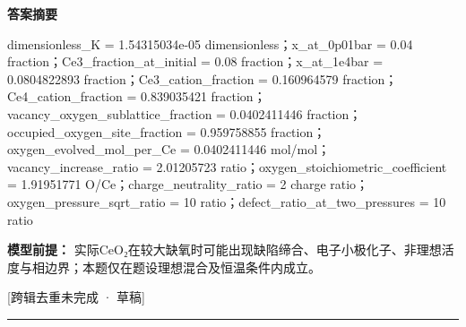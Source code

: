 \documentclass[UTF8,11pt,a4paper]{ctexart}
\begin{document}
\noindent\textbf{答案摘要}\par
dimensionless\_K = 1.54315034e-05 dimensionless；x\_at\_0p01bar = 0.04 fraction；Ce3\_fraction\_at\_initial = 0.08 fraction；x\_at\_1e4bar = 0.0804822893 fraction；Ce3\_cation\_fraction = 0.160964579 fraction；Ce4\_cation\_fraction = 0.839035421 fraction；vacancy\_oxygen\_sublattice\_fraction = 0.0402411446 fraction；occupied\_oxygen\_site\_fraction = 0.959758855 fraction；oxygen\_evolved\_mol\_per\_Ce = 0.0402411446 mol/mol；vacancy\_increase\_ratio = 2.01205723 ratio；oxygen\_stoichiometric\_coefficient = 1.91951771 O/Ce；charge\_neutrality\_ratio = 2 charge ratio；oxygen\_pressure\_sqrt\_ratio = 10 ratio；defect\_ratio\_at\_two\_pressures = 10 ratio\par
\noindent\textbf{模型前提：}
实际CeO₂在较大缺氧时可能出现缺陷缔合、电子小极化子、非理想活度与相边界；本题仅在题设理想混合及恒温条件内成立。\par
\noindent\textcolor{red!65!black}{[跨辑去重未完成 · 草稿]} \par
\medskip\hrule\medskip
{}
\end{document}
